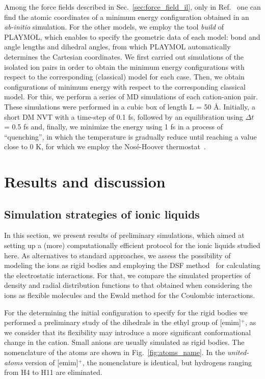 \documentclass[3p,twocolumn]{elsarticle}
\begin{document}
Among the force fields described in Sec.~\ref{sec:force_field_il}, only in Ref.~ one can find the atomic coordinates of a minimum energy configuration obtained in an \textit{ab-initio} simulation. For the other models, we employ the tool \textit{build} of PLAYMOL, which enables to specify the geometric data of each model: bond and angle lengths and dihedral angles, from which PLAYMOL automatically determines the Cartesian coordinates. We first carried out simulations of the isolated ion pairs in order to obtain the minimum energy configurations with respect to the corresponding (classical) model for each case. Then, we obtain configurations of minimum energy with respect to the corresponding classical model. For this, we perform a series of MD simulations of each cation-anion pair. These simulations were performed in a cubic box of length L = 50 {\AA}. Initially, a short DM NVT with a time-step of 0.1 fs, followed by an equilibration using $\Delta t$ = 0.5 fs and, finally, we minimize the energy using 1 fs in a process of ``quenching'', in which the temperature is gradually reduce until reaching a value close to 0 K, for which we employ the Nos\'{e}-Hoover thermostat~\cite{Martyna1992}.

\section{Results and discussion}
\label{sec:results}

\subsection{Simulation strategies of ionic liquids}
\label{sec:prel_results}

In this section, we present results of preliminary simulations, which aimed at setting up a (more) computationally efficient protocol for the ionic liquids studied here. As alternatives to standard approaches, we assess the possibility of modeling the ions as rigid bodies and employing the DSF method~\cite{Fennell2006} for calculating the electrostatic interactions. For that, we compare the simulated properties of density and radial distribution functions to that obtained when considering the ions as flexible molecules and the Ewald method for the Coulombic interactions.

For the determining the initial configuration to specify for the rigid bodies we performed a preliminary study of the dihedrals in the ethyl group of [emim]$^{+}$, as we consider that its flexibility  may introduce a more significant conformational change in the cation. Small anions are usually simulated as rigid bodies. The nomenclature of the atoms are shown in Fig.~\ref{fig:atoms_name}. In the \textit{united-atoms} version of [emim]$^{+}$,  the nomenclature is identical, but hydrogens ranging from H4 to H11 are eliminated.
\end{document}
